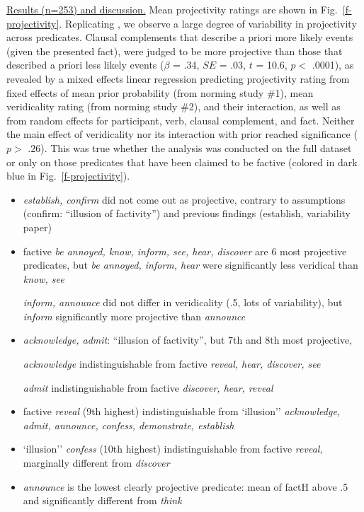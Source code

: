 \documentclass[12pt,fleqn]{article}
\newcommand{\6}{\mbox{$[\hspace*{-.6mm}[$}}
\newcommand{\9}{\mbox{$]\hspace*{-.6mm}]$}}
\begin{document}
\underline{Results (n=253) and discussion.}  Mean projectivity ratings are shown in Fig.~\ref{f-projectivity}. Replicating \citealt{tbd-variability}, we observe a large degree of variability in projectivity across predicates. Clausal complements that describe a priori more likely events (given the presented fact), were judged to be more projective than those that described a priori less likely events ($\beta$ = .34, $SE$ = .03, $t$ = 10.6, $p <$ .0001), as revealed by a mixed effects linear regression predicting projectivity rating from fixed effects of mean prior probability (from norming study \#1), mean veridicality rating (from norming study \#2), and their interaction, as well as from random effects for participant, verb, clausal complement, and fact. Neither the main effect of veridicality nor its interaction with prior reached significance ($p >$ .26). This was true whether the analysis was conducted on the full dataset or only on those predicates that have been claimed to be factive (colored in dark blue in Fig.~\ref{f-projectivity}).

\begin{itemize}

\item {\em establish, confirm} did not come out as projective, contrary to assumptions (confirm: ``illusion of factivity'') and previous findings (establish, variability paper)

\item factive {\em be annoyed, know, inform, see, hear, discover} are 6 most projective predicates, but {\em be annoyed, inform, hear} were significantly less veridical than {\em know, see} 

{\em inform, announce} did not differ in veridicality (.5, lots of variability), but {\em inform} significantly more projective than {\em announce} 

\item {\em acknowledge, admit}: ``illusion of factivity'', but 7th and 8th most projective, 

{\em acknowledge} indistinguishable from factive {\em reveal, hear, discover, see}

{\em admit} indistinguishable from factive {\em discover, hear, reveal}

\item factive {\em reveal} (9th highest) indistinguishable from `illusion'' {\em acknowledge, admit, announce, confess, demonstrate, establish}

\item `illusion'' {\em confess} (10th highest) indistinguishable from factive {\em reveal}, marginally different from {\em discover}

\item {\em announce} is the lowest clearly projective predicate: mean of factH above .5 and significantly different from {\em think}



\end{itemize}
\end{document}
